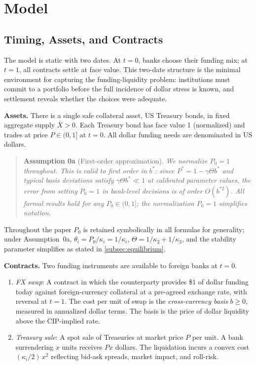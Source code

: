 \section{Model}
\label{sec:model}

\subsection{Timing, Assets, and Contracts}
\label{subsec:timing}

The model is static with two dates. At $t=0$, banks choose their funding mix; at $t=1$, all
contracts settle at face value. This two-date structure is the minimal environment for capturing
the funding-liquidity problem: institutions must commit to a portfolio before the full incidence
of dollar stress is known, and settlement reveals whether the choices were adequate.

\textbf{Assets.} There is a single safe collateral asset, US Treasury bonds, in fixed aggregate
supply $\bar{X} > 0$. Each Treasury bond has face value 1 (normalized) and trades at price
$P \in (0,1]$ at $t=0$. All dollar funding needs are denominated in US dollars.

\begin{quote}
\textbf{Assumption 0a} (First-order approximation). \textit{We normalize $P_0 = 1$ throughout.
This is valid to first order in $b^*$: since $P^* = 1 - \gamma\Theta b^*$ and typical basis
deviations satisfy $\gamma\Theta b^* \ll 1$ at calibrated parameter values, the error from
setting $P_0 = 1$ in bank-level decisions is of order $O(b^{*2})$. All formal results hold for
any $P_0 \in (0,1]$; the normalization $P_0 = 1$ simplifies notation.}
\end{quote}

Throughout the paper $P_0$ is retained symbolically in all formulas for generality; under
Assumption~0a, $\theta_i = P_0/\kappa_i = 1/\kappa_i$, $\Theta = 1/\kappa_2 + 1/\kappa_3$, and the
stability parameter simplifies as stated in \cref{subsec:equilibrium}.

\textbf{Contracts.} Two funding instruments are available to foreign banks at $t=0$.

\begin{enumerate}[label=(\roman*)]
  \item \textit{FX swap}: A contract in which the counterparty provides \$1 of dollar funding
    today against foreign-currency collateral at a pre-agreed exchange rate, with reversal at
    $t=1$. The cost per unit of swap is the \textit{cross-currency basis} $b \geq 0$, measured in
    annualized dollar terms. The basis is the price of dollar liquidity above the CIP-implied rate.

  \item \textit{Treasury sale}: A spot sale of Treasuries at market price $P$ per unit. A bank
    surrendering $x$ units receives $Px$ dollars. The liquidation incurs a convex cost
    $(\kappa_i/2)\,x^2$ reflecting bid-ask spreads, market impact, and roll-risk.
\end{enumerate}


